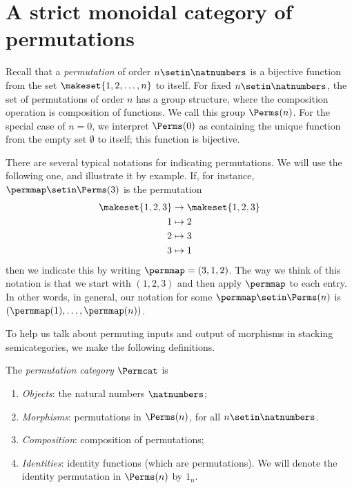 
\section{A strict monoidal category of permutations}
\label{sec:parallelism-and-permutations}



Recall that a \emph{permutation} of order $n \setin\natnumbers$ is a bijective function from the set $\makeset{1,2, \dots , n}$ to itself.
For fixed $n \setin\natnumbers$, the set of permutations of order $n$ has a group structure, where the composition operation is composition of functions.
We call this group $\Perms(n)$.
For the special case of $n = 0$, we interpret $\Perms(0)$ as containing the unique function from the empty set $\emptyset$ to itself; this function is bijective.

There are several typical notations for indicating permutations.
We will use the following one, and illustrate it by example.
If, for instance, $\permmap \setin \Perms(3)$ is the permutation
\begin{align*}
    \makeset{1,2,3} & \to \makeset{1,2,3} \\
    1               & \mapsto 2 \\
    2               & \mapsto 3 \\
    3               & \mapsto 1
\end{align*}
then we indicate this by writing $\permmap = (3, 1, 2)$.
The way we think of this notation is that we start with $(1, 2, 3)$ and then apply $\permmap$ to each entry.
In other words, in general, our notation for some $\permmap \setin \Perms(n)$ is $(\permmap(1), \dots, \permmap(n))$.

To help us talk about permuting inputs and output of morphisms in stacking semicategories, we make the following definitions.

\begin{definition}\label{def:Permcat}
    The \emph{permutation category} $\Permcat$ is
    \begin{enumerate}
        \item \emph{Objects}: the natural numbers $\natnumbers$;
        \item \emph{Morphisms}: permutations in $\Perms(n)$, for all $n \setin \natnumbers$.
        \item \emph{Composition}: composition of permutations;
        \item \emph{Identities}: identity functions (which are permutations).
              We will denote the identity permutation in $\Perms(n)$ by $1_n$.
    \end{enumerate}
\end{definition}

